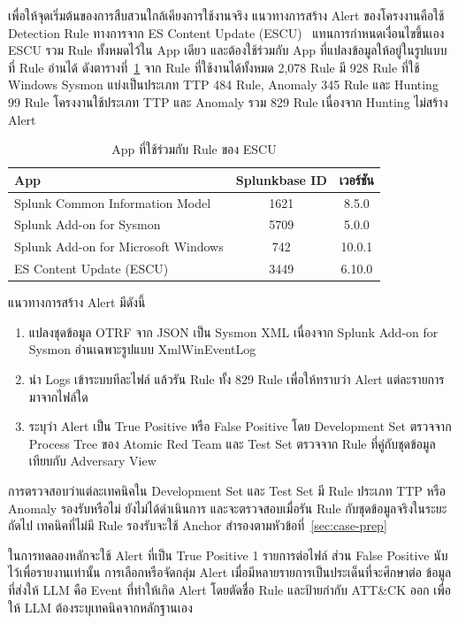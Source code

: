 เพื่อให้จุดเริ่มต้นของการสืบสวนใกล้เคียงการใช้งานจริง
แนวทางการสร้าง Alert ของโครงงานคือใช้ Detection Rule ทางการจาก ES Content Update (ESCU)~\cite{splunk-escu}
แทนการกำหนดเงื่อนไขขึ้นเอง ESCU รวม Rule ทั้งหมดไว้ใน App เดียว
และต้องใช้ร่วมกับ App ที่แปลงข้อมูลให้อยู่ในรูปแบบที่ Rule อ่านได้ ดังตารางที่~\ref{tab:splunk-apps}
จาก Rule ที่ใช้งานได้ทั้งหมด 2,078 Rule มี 928 Rule ที่ใช้ Windows Sysmon
แบ่งเป็นประเภท TTP 484 Rule, Anomaly 345 Rule และ Hunting 99 Rule
โครงงานใช้ประเภท TTP และ Anomaly รวม 829 Rule เนื่องจาก Hunting ไม่สร้าง Alert

\begin{table}[ht]
  \centering
  \caption{App ที่ใช้ร่วมกับ Rule ของ ESCU}
  \label{tab:splunk-apps}
  \small
  \begin{tabular}{|l|c|c|}
    \hline
    \textbf{App} & \textbf{Splunkbase ID} & \textbf{เวอร์ชัน} \\ \hline
    Splunk Common Information Model & 1621 & 8.5.0 \\ \hline
    Splunk Add-on for Sysmon & 5709 & 5.0.0 \\ \hline
    Splunk Add-on for Microsoft Windows & 742 & 10.0.1 \\ \hline
    ES Content Update (ESCU) & 3449 & 6.10.0 \\ \hline
  \end{tabular}
\end{table}

แนวทางการสร้าง Alert มีดังนี้
\begin{enumerate}
  \item แปลงชุดข้อมูล OTRF จาก JSON เป็น Sysmon XML
        เนื่องจาก Splunk Add-on for Sysmon อ่านเฉพาะรูปแบบ XmlWinEventLog
  \item นำ Logs เข้าระบบทีละไฟล์ แล้วรัน Rule ทั้ง 829 Rule
        เพื่อให้ทราบว่า Alert แต่ละรายการมาจากไฟล์ใด
  \item ระบุว่า Alert เป็น True Positive หรือ False Positive
        โดย Development Set ตรวจจาก Process Tree ของ Atomic Red Team
        และ Test Set ตรวจจาก Rule ที่คู่กับชุดข้อมูลเทียบกับ Adversary View
\end{enumerate}

การตรวจสอบว่าแต่ละเทคนิคใน Development Set และ Test Set มี Rule ประเภท TTP หรือ Anomaly รองรับหรือไม่
ยังไม่ได้ดำเนินการ และจะตรวจสอบเมื่อรัน Rule กับชุดข้อมูลจริงในระยะถัดไป
เทคนิคที่ไม่มี Rule รองรับจะใช้ Anchor สำรองตามหัวข้อที่~\ref{sec:case-prep}

ในการทดลองหลักจะใช้ Alert ที่เป็น True Positive 1 รายการต่อไฟล์ ส่วน False Positive นับไว้เพื่อรายงานเท่านั้น
การเลือกหรือจัดกลุ่ม Alert เมื่อมีหลายรายการเป็นประเด็นที่จะศึกษาต่อ
ข้อมูลที่ส่งให้ LLM คือ Event ที่ทำให้เกิด Alert โดยตัดชื่อ Rule และป้ายกำกับ ATT\&CK ออก
เพื่อให้ LLM ต้องระบุเทคนิคจากหลักฐานเอง

